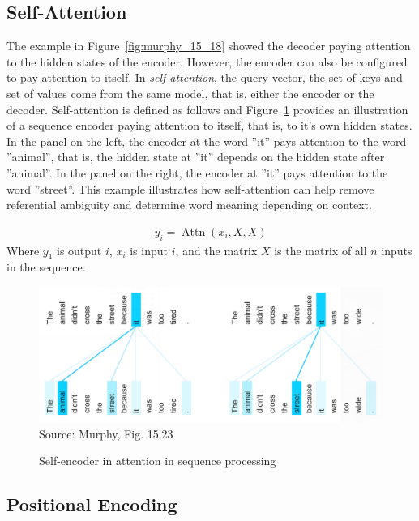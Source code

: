 \subsection*{Self-Attention}

The example in Figure~\ref{fig:murphy_15_18} showed the decoder paying attention to the hidden states of the encoder. However, the encoder can also be configured to pay attention to itself. In \emph{self-attention}, the query vector, the set of keys and set of values come from the same model, that is, either the encoder or the decoder. Self-attention is defined as follows and Figure~\ref{fig:murphy_15_23} provides an illustration of a sequence encoder paying attention to itself, that is, to it's own hidden states. In the panel on the left, the encoder at the word ''it'' pays attention to the word ''animal'', that is, the hidden state at ''it'' depends on the hidden state after ''animal''. In the panel on the right, the encoder at ''it'' pays attention to the word ''street''. This example illustrates how self-attention can help remove referential ambiguity and determine word meaning depending on context. 

\begin{align*}
y_i = \operatorname{Attn}(x_i, X, X)
\end{align*}
Where $y_1$ is output $i$, $x_i$ is input $i$, and the matrix $X$ is the matrix of all $n$ inputs in the sequence. 

\begin{figure}
\begin{center}
\includegraphics[width=\textwidth]{murphy_15_23.png} \\

\scriptsize Source: Murphy, Fig. 15.23 \normalsize
\end{center}
\caption{Self-encoder in attention in sequence processing}
\label{fig:murphy_15_23}
\end{figure}


\subsection*{Positional Encoding}


